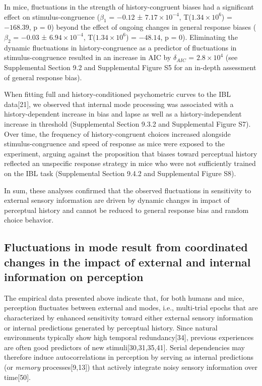 \documentclass[
]{article}
\begin{document}
In mice, fluctuations in the strength of history-congruent biases had a
significant effect on stimulus-congruence (\(\beta_1\) = \(-0.12\) ±
\(\ensuremath{7.17\times 10^{-4}}\),
T(\(\ensuremath{1.34\times 10^{6}}\)) = \(-168.39\), p = \(0\)) beyond
the effect of ongoing changes in general response biases (\(\beta_2\) =
\(-0.03\) ± \(\ensuremath{6.94\times 10^{-4}}\),
T(\(\ensuremath{1.34\times 10^{6}}\)) = \(-48.14\), p = \(0\)).
Eliminating the dynamic fluctuations in history-congruence as a
predictor of fluctuations in stimulus-congruence resulted in an increase
in AIC by \(\delta_{AIC}\) = \(\ensuremath{2.8\times 10^{4}}\) (see
Supplemental Section 9.2 and Supplemental Figure S5 for an in-depth
assessment of general response bias).

When fitting full and history-conditioned psychometric curves to the IBL
data{[}21{]}, we observed that internal mode processing was associated
with a history-dependent increase in bias and lapse as well as a
history-independent increase in threshold (Supplemental Section 9.3.2
and Supplemental Figure S7). Over time, the frequency of
history-congruent choices increased alongside stimulus-congruence and
speed of response as mice were exposed to the experiment, arguing
against the proposition that biases toward perceptual history reflected
an unspecific response strategy in mice who were not sufficiently
trained on the IBL task (Supplemental Section 9.4.2 and Supplemental
Figure S8).

In sum, these analyses confirmed that the observed fluctuations in
sensitivity to external sensory information are driven by dynamic
changes in impact of perceptual history and cannot be reduced to general
response bias and random choice behavior.

\hypertarget{fluctuations-in-mode-result-from-coordinated-changes-in-the-impact-of-external-and-internal-information-on-perception}{%
\subsection{Fluctuations in mode result from coordinated changes in the
impact of external and internal information on
perception}\label{fluctuations-in-mode-result-from-coordinated-changes-in-the-impact-of-external-and-internal-information-on-perception}}

The empirical data presented above indicate that, for both humans and
mice, perception fluctuates between external and modes, i.e.,
multi-trial epochs that are characterized by enhanced sensitivity toward
either external sensory information or internal predictions generated by
perceptual history. Since natural environments typically show high
temporal redundancy{[}34{]}, previous experiences are often good
predictors of new stimuli{[}30,31,35,41{]}. Serial dependencies may
therefore induce autocorrelations in perception by serving as internal
predictions (or \emph{memory} processes{[}9,13{]}) that actively
integrate noisy sensory information over time{[}50{]}.
\end{document}
